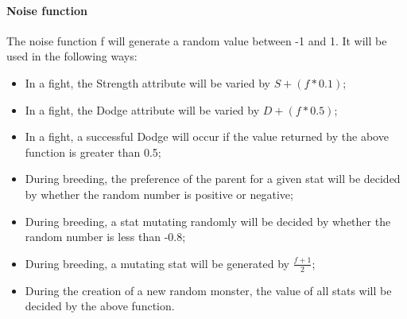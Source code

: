 \paragraph{Noise function} The noise function f will generate a random value between -1 and 1. It will be used in the following ways:
\begin{itemize}
\item{In a fight, the Strength attribute will be varied by \begin{math}S+(f*0.1)\end{math};}
\item{In a fight, the Dodge attribute will be varied by \begin{math}D+(f*0.5)\end{math};}
\item{In a fight, a successful Dodge will occur if the value returned by the above function is greater than 0.5;}
\item{During breeding, the preference of the parent for a given stat will be decided by whether the random number is positive or negative;}
\item{During breeding, a stat mutating randomly will be decided by whether the random number is less than -0.8;}
\item{During breeding, a mutating stat will be generated by \begin{math}\frac{f+1}{2}\end{math};}
\item{During the creation of a new random monster, the value of all stats will be decided by the above function.}
\end{itemize}
